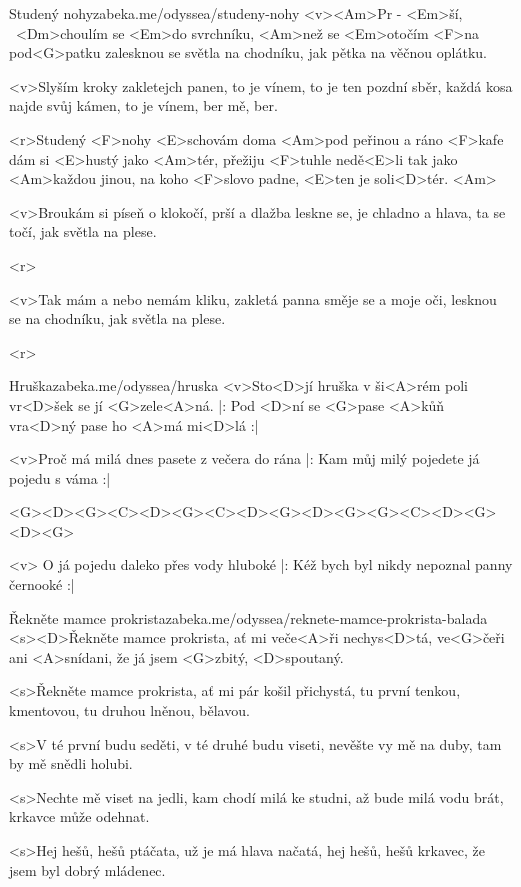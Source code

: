 \begin{song}[Radůza]{14}{Studený nohy}{zabeka.me/odyssea/studeny-nohy}
	<v><Am>Pr - <Em>ší, \ <Dm>choulím se <Em>do svrchníku,
	<Am>než se <Em>otočím <F>na pod<G>patku
	zalesknou se světla na chodníku,
	jak pětka na věčnou oplátku.

	<v>Slyším kroky zakletejch panen,
	to je vínem, to je ten pozdní sběr,
	každá kosa najde svůj kámen,
	to je vínem, ber mě, ber.

	<r>Studený <F>nohy <E>schovám doma <Am>pod peřinou
	a ráno <F>kafe dám si <E>hustý jako <Am>tér,
	přežiju <F>tuhle nedě<E>li tak jako <Am>každou jinou,
	na koho <F>slovo padne, <E>ten je soli<D>tér. <Am>

	<v>Broukám si píseň o klokočí,
	prší a dlažba leskne se,
	je chladno a hlava, ta se točí,
	jak světla na plese.

	<r>

	<v>Tak mám a nebo nemám kliku,
	zakletá panna směje se
	a moje oči, lesknou se na chodníku,
	jak světla na plese.

	<r>
\end{song}
\begin{song}[Čechomor]{15}{Hruška}{zabeka.me/odyssea/hruska}
	<v>Sto<D>jí hruška v ši<A>rém poli
	vr<D>šek se jí <G>zele<A>ná.
	|: Pod <D>ní se <G>pase <A>kůň vra<D>ný
	pase ho <A>má mi<D>lá :|

	<v>Proč má milá dnes pasete
	z večera do rána
	|: Kam můj milý pojedete
	já pojedu s váma :|

	<G><D><G><C><D><G><C><D><G><D><G><G><C><D><G><D><G>

	<v> O já pojedu daleko
	přes vody hluboké
	|: Kéž bych byl nikdy nepoznal
	panny černooké :|
\end{song}
\begin{song}{16}{Řekněte mamce prokrista}{zabeka.me/odyssea/reknete-mamce-prokrista-balada}
	<s><D>Řekněte mamce prokrista, ať mi veče<A>ři nechys<D>tá,
	ve<G>čeři ani <A>snídani, že já jsem <G>zbitý, <D>spoutaný.

	<s>Řekněte mamce prokrista, ať mi pár košil přichystá,
	tu první tenkou, kmentovou, tu druhou lněnou, bělavou.

	<s>V té první budu seděti, v té druhé budu viseti,
	nevěšte vy mě na duby, tam by mě snědli holubi.

	<s>Nechte mě viset na jedli, kam chodí milá ke studni,
	až bude milá vodu brát, krkavce může odehnat.

	<s>Hej hešů, hešů ptáčata, už je má hlava načatá,
	hej hešů, hešů krkavec, že jsem byl dobrý mládenec.

\end{song}
